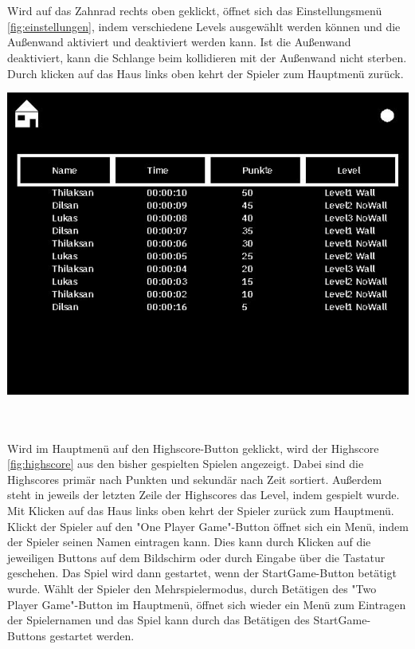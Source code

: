 \newline \\ \\
Wird auf das Zahnrad rechts oben geklickt, öffnet sich das Einstellungsmenü \ref{fig:einstellungen}, indem verschiedene Levels ausgewählt werden können und die Außenwand aktiviert und deaktiviert werden kann. Ist die Außenwand deaktiviert, kann die Schlange beim kollidieren mit der Außenwand nicht sterben. Durch klicken auf das Haus links oben kehrt der Spieler zum Hauptmenü zurück.\newline \newline \\ 
\begin{minipage}[X]{1.1\textwidth}
 \centering
 \includegraphics[scale=0.5]{bilder/Highscore}
 \label{fig:highscore}
\end{minipage}
\newline \\ \\
Wird im Hauptmenü auf den Highscore-Button geklickt, wird der Highscore \ref{fig:highscore} aus den bisher gespielten Spielen angezeigt. Dabei sind die Highscores primär nach Punkten und sekundär nach Zeit sortiert. Außerdem steht in jeweils der letzten Zeile der Highscores das Level, indem gespielt wurde. Mit Klicken auf das Haus links oben kehrt der Spieler zurück zum Hauptmenü.
\\
 Klickt der Spieler auf den "One Player Game"-Button öffnet sich ein Menü, indem der Spieler seinen Namen eintragen kann. Dies kann durch Klicken auf die jeweiligen Buttons auf dem Bildschirm oder durch Eingabe über die Tastatur geschehen. Das Spiel wird dann gestartet, wenn der StartGame-Button betätigt wurde. Wählt der Spieler den Mehrspielermodus, durch Betätigen des "Two Player Game"-Button im Hauptmenü, öffnet sich wieder ein Menü zum Eintragen der Spielernamen und das Spiel kann durch das Betätigen des StartGame-Buttons gestartet werden.  


